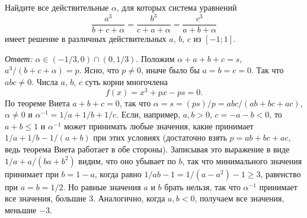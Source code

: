 \problem
Найдите все действительные $\alpha$, для которых система уравнений
\[
    \frac{a^3}{b + c + \alpha}
=
    \frac{b^3}{c + a + \alpha}
=
    \frac{c^3}{a + b + \alpha}
\]
имеет решение в различных действительных $a$, $b$, $c$ из $[-1; 1]$.


\solution
\emph{Ответ:} $\alpha \in (-1/3, 0) \cap (0, 1/3)$.
Положим $\alpha + a + b + c = s$, $a^3 / (b + c + \alpha) = p$.
Ясно, что $p \ne 0$, иначе было бы $a = b = c = 0$.
Так что $a b c \ne 0$.
Числа $a$, $b$, $c$ суть корни многочлена \[f(x)=x^3+px-ps=0.\]
По теореме Виета $a + b + c = 0$, так что
$\alpha = s = (p s) / p = a b c / (a b + b c + a c)$,
$\alpha \ne 0$
и
$\alpha^{-1} = 1 / a + 1 / b + 1 / c$.
Если, например, $a, b > 0$, $c = -a - b < 0$, то
$a + b \leq 1$ и $\alpha^{-1}$
может принимать любые значения, какие принимает
$1 / a + 1 / b - 1 / (a + b)$
при этих условиях
(достаточно взять $p = a b + b c + a c$, ведь теорема Виета работает в обе
стороны).
Записывая это выражение в виде $1 / a + a / (b a + b^2)$ видим, что оно убывает
по $b$, так что минимального значения принимает при $b = 1 - a$, когда равно
$1 / a b - 1 = 1 / (a - a^2) - 1 \geq 3$, равенство при $a = b = 1 / 2$.
Но равные значения $a$ и $b$ брать нельзя, так что $\alpha^{-1}$ принимает все
значения, большие $3$.
Аналогично, когда $a, b < 0$, получаем все значения, меньшие $-3$.
\endproblem
